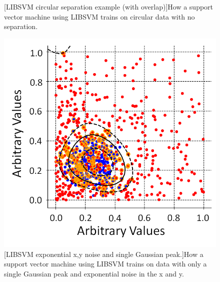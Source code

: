 \begin{figure}[!h]
\begin{minipage}{.45\textwidth}
  [LIBSVM circular separation example (with overlap)]{How a  support vector machine using LIBSVM trains on circular data with no separation.}
  \label{fig:CircleNoSepExample}
\end{minipage}
\end{figure}

\begin{figure}[!h]
 \centering
 \includegraphics[width=0.5\linewidth]{Chapter4/Figs/adjustedSvmPlots/adjusted_exp_1GausseExample.png}
 [LIBSVM  exponential x,y noise and single Gaussian peak.]{How a  support vector machine using LIBSVM trains on data with only a single Gaussian peak and exponential noise in the x and y.} 
 \label{fig:exp_1GausseExample}
\end{figure}

